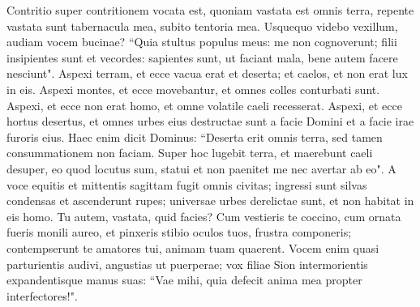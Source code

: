 \begin{biblechapter}
\verse Contritio super contritionem vocata est, quoniam vastata est omnis terra, repente vastata sunt tabernacula mea, subito tentoria mea. 
\verse Usquequo videbo vexillum, audiam vocem bucinae? 
\verse “Quia stultus populus meus: me non cognoverunt; filii insipientes sunt et vecordes: sapientes sunt, ut faciant mala, bene autem facere nesciunt". 
\verse Aspexi terram, et ecce vacua erat et deserta; et caelos, et non erat lux in eis. 
\verse Aspexi montes, et ecce movebantur, et omnes colles conturbati sunt. 
\verse Aspexi, et ecce non erat homo, et omne volatile caeli recesserat. 
\verse Aspexi, et ecce hortus desertus, et omnes urbes eius destructae sunt a facie Domini et a facie irae furoris eius. 
\verse Haec enim dicit Dominus: “Deserta erit omnis terra, sed tamen consummationem non faciam. 
\verse Super hoc lugebit terra, et maerebunt caeli desuper, eo quod locutus sum, statui et non paenitet me nec avertar ab eo". 
\verse A voce equitis et mittentis sagittam fugit omnis civitas; ingressi sunt silvas condensas et ascenderunt rupes; universae urbes derelictae sunt, et non habitat in eis homo. 
\verse Tu autem, vastata, quid facies? Cum vestieris te coccino, cum ornata fueris monili aureo, et pinxeris stibio oculos tuos, frustra componeris; contempserunt te amatores tui, animam tuam quaerent. 
\verse Vocem enim quasi parturientis audivi, angustias ut puerperae; vox filiae Sion intermorientis expandentisque manus suas: “Vae mihi, quia defecit anima mea propter interfectores!". 
\end{biblechapter}

